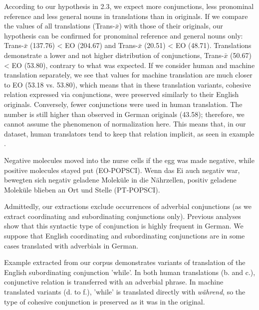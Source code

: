 \documentclass[output=paper]{LSP/langsci}
\begin{document}
According to our hypothesis in 2.3, we expect more conjunctions, less pronominal reference and less general nouns in translations than in originals. If we compare the values of all translations (Trans-$\bar{x}$) with those of their originals, our hypothesis can be confirmed for pronominal reference and general nouns only: Trans-$\bar{x}$ (137.76) < EO (204.67) and Trans-$\bar{x}$ (20.51) < EO (48.71). Translations demonstrate a lower and not higher distribution of conjunctions, Trans-$\bar{x}$ (50.67) < EO (53.80), contrary to what was expected. If we consider human and machine translation separately, we see that values for machine translation are much closer to EO (53.18 vs. 53.80), which means that in these translation variants, cohesive relation expressed via conjunctions, were preserved similarly to their English originals. Conversely, fewer conjunctions were used in human translation. The number is still higher than observed in German originals (43.58); therefore, we cannot assume the phenomenon of normalization here. This means that, in our dataset, human translators tend to keep that relation implicit, as seen in example .



\ea \label{ex:4:3}
\ea Negative molecules moved into the nurse cells if the egg was made negative, while positive molecules stayed put (EO-POPSCI).
\ex Wenn das Ei auch negativ war, bewegten sich negativ geladene Moleküle in die Nährzellen, positiv geladene Moleküle blieben an Ort und Stelle (PT-POPSCI).
\z
\z

Admittedly, our extractions exclude occurrences of adverbial conjunctions (as we extract coordinating and subordinating conjunctions only). Previous analyses \citep[e.g.][]{KunzLapshinova2014} show that this syntactic type of conjunction is highly frequent in German. We suppose that English coordinating and subordinating conjunctions are in some cases translated with adverbials in German. 

Example  extracted from our corpus demonstrates variants of translation of the English subordinating conjunction 'while'. In both human translations (b. and c.), conjunctive relation is transferred with an adverbial phrase. In machine translated variants (d. to f.), 'while' is translated directly with \textit{während}, so the type of cohesive conjunction is preserved as it was in the original.
\end{document}
